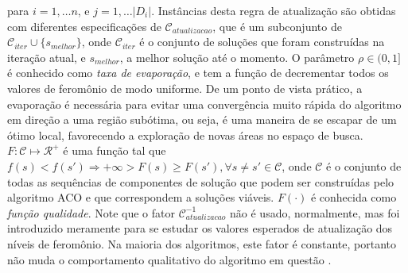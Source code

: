 para $i = 1, \ldots n$, e $j = 1, \ldots |D_{i}|$. Instâncias desta regra de
atualização são obtidas com diferentes especificações de
$\mathcal{C}_{atualizacao}$, que é um subconjunto de $\mathcal{C}_{iter} \cup
\{s_{melhor}\}$, onde $\mathcal{C}_{iter}$ é o conjunto de soluções que foram
construídas na iteração atual, e $s_{melhor}$, a melhor solução até o momento.
O parâmetro $\rho \in (0, 1]$ é conhecido como \textit{taxa de evaporação}, e
tem a função de decrementar todos os valores de feromônio de modo uniforme. De
um ponto de vista prático, a evaporação é necessária para evitar uma
convergência muito rápida do algoritmo em direção a uma região subótima, ou
seja, é uma maneira de se escapar de um ótimo local, favorecendo a exploração
de novas áreas no espaço de busca. $F: \mathcal{C} \mapsto \mathcal{R}^{+}$ é
uma função tal que $f(s) < f(s') \Rightarrow +\infty > F(s) \geq F(s'), \forall
s \neq s' \in \mathcal{C}$, onde $\mathcal{C}$ é o conjunto de todas as
sequências de componentes de solução que podem ser construídas pelo algoritmo
ACO e que correspondem a soluções viáveis. $F(\cdot)$ é conhecida como
\textit{função qualidade}. Note que o fator $\mathcal{C}_{atualizacao}^{-1}$
não é usado, normalmente, mas foi introduzido meramente para se estudar os
valores esperados de atualização dos níveis de feromônio. Na maioria dos
algoritmos, este fator é constante, portanto não muda o comportamento
qualitativo do algoritmo em questão \cite{dorigo2005ant}.

% 

% 
% 
% 
% 
% 
% 

